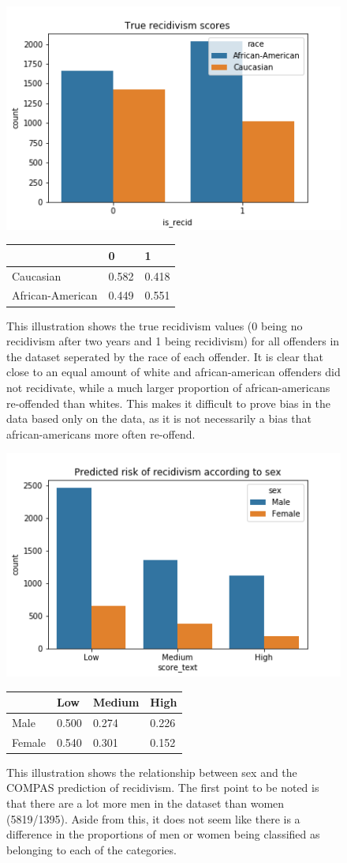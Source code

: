 \documentclass[11pt, fleqn, titlepage]{article}
\begin{document}
	
	\begin{figure}[H]
		\centering
		\includegraphics[width=0.5\linewidth]{imgs/true_recid}
		\begin{table}[H]
			\centering
			\begin{tabular}{|l|l|l|}
				\hline
				& 0   & 1  \\ \hline
				Caucasian        & 0.582 & 0.418  \\ \hline
				African-American & 0.449 & 0.551  \\ \hline
			\end{tabular}
		\end{table}
		\caption{This illustration shows the true recidivism values (0 being no recidivism after two years and 1 being recidivism) for all offenders in the dataset seperated by the race of each offender. It is clear that close to an equal amount of white and african-american offenders did not recidivate, while a much larger proportion of african-americans re-offended than whites. This makes it difficult to prove bias in the data based only on the data, as it is not necessarily a bias that african-americans more often re-offend.}
		\label{fig:truerecid}
	\end{figure}
	
	\begin{figure}[H]
		\centering
		\includegraphics[width=0.5\linewidth]{imgs/predicted_recid_sex}
		\begin{table}[H]
			\centering
			\begin{tabular}{|l|l|l|l|}
				\hline
				& Low   & Medium & High  \\ \hline
				Male      & 0.500 & 0.274  & 0.226 \\ \hline
				Female    & 0.540 & 0.301  & 0.152 \\ \hline
			\end{tabular}
		\end{table}
		\caption{This illustration shows the relationship between sex and the COMPAS prediction of recidivism. The first point to be noted is that there are a lot more men in the dataset than women (5819/1395). Aside from this, it does not seem like there is a difference in the proportions of men or women being classified as belonging to each of the categories.}
		\label{fig:predictedrecidsex}
	\end{figure}
	
\end{document}
